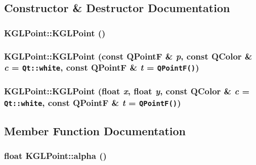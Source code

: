 \subsection{Constructor \& Destructor Documentation}
\hypertarget{class_k_g_l_point_ec90027724e47b130bfa7baa537c3525}{
\subsubsection[{KGLPoint}]{\setlength{\rightskip}{0pt plus 5cm}KGLPoint::KGLPoint ()}}
\label{class_k_g_l_point_ec90027724e47b130bfa7baa537c3525}


\hypertarget{class_k_g_l_point_f07f3a2263c4855e244e07b4008aed3b}{
\subsubsection[{KGLPoint}]{\setlength{\rightskip}{0pt plus 5cm}KGLPoint::KGLPoint (const QPointF \& {\em p}, \/  const QColor \& {\em c} = {\tt Qt::white}, \/  const QPointF \& {\em t} = {\tt QPointF()})}}
\label{class_k_g_l_point_f07f3a2263c4855e244e07b4008aed3b}


\hypertarget{class_k_g_l_point_0c51439bef1f4a13b842fe374d26f67d}{
\subsubsection[{KGLPoint}]{\setlength{\rightskip}{0pt plus 5cm}KGLPoint::KGLPoint (float {\em x}, \/  float {\em y}, \/  const QColor \& {\em c} = {\tt Qt::white}, \/  const QPointF \& {\em t} = {\tt QPointF()})}}
\label{class_k_g_l_point_0c51439bef1f4a13b842fe374d26f67d}




\subsection{Member Function Documentation}
\hypertarget{class_k_g_l_point_638b9d22b3bc3fd7d18d073de199d6f4}{
\subsubsection[{alpha}]{\setlength{\rightskip}{0pt plus 5cm}float KGLPoint::alpha ()}}
\label{class_k_g_l_point_638b9d22b3bc3fd7d18d073de199d6f4}


